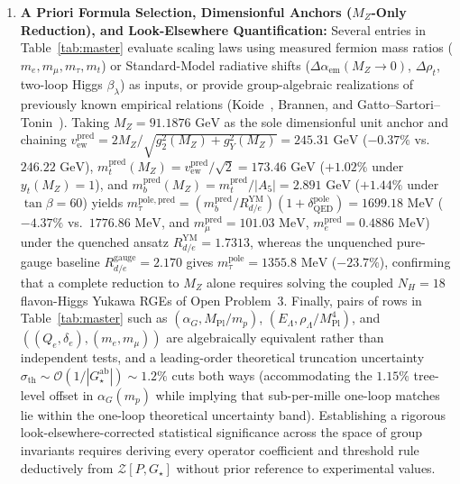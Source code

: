 \documentclass[11pt,a4paper]{article}
\theoremstyle{definition}
\theoremstyle{remark}
\newcommand{\Gstar}{G_\star}
\begin{document}
\begin{enumerate}
    \item \textbf{A Priori Formula Selection, Dimensionful Anchors ($M_Z$-Only Reduction), and Look-Elsewhere Quantification:}
    Several entries in Table~\ref{tab:master} evaluate scaling laws using measured fermion mass ratios ($m_e, m_\mu, m_\tau, m_t$) or Standard-Model radiative shifts ($\Delta\alpha_{\mathrm{em}}(M_Z \to 0)$, $\Delta\rho_t$, two-loop Higgs $\beta_\lambda$) as inputs, or provide group-algebraic realizations of previously known empirical relations (Koide~\cite{Koide1983}, Brannen, and Gatto--Sartori--Tonin~\cite{GattoSartoriTonin1968}). Taking $M_Z = 91.1876\text{ GeV}$ as the sole dimensionful unit anchor and chaining $v_{\mathrm{ew}}^{\mathrm{pred}} = 2M_Z/\sqrt{g_2^2(M_Z) + g_Y^2(M_Z)} = 245.31\text{ GeV}$ ($-0.37\%$ vs.\ $246.22\text{ GeV}$), $m_t^{\mathrm{pred}}(M_Z) = v_{\mathrm{ew}}^{\mathrm{pred}}/\sqrt{2} = 173.46\text{ GeV}$ ($+1.02\%$ under $y_t(M_Z) = 1$), and $m_b^{\mathrm{pred}}(M_Z) = m_t^{\mathrm{pred}}/|A_5| = 2.891\text{ GeV}$ ($+1.44\%$ under $\tan\beta = 60$) yields $m_\tau^{\mathrm{pole,pred}} = (m_b^{\mathrm{pred}}/R_{d/e}^{\mathrm{YM}})(1 + \delta_{\mathrm{QED}}^{\mathrm{pole}}) = 1699.18\text{ MeV}$ ($-4.37\%$ vs.\ $1776.86\text{ MeV}$, and $m_\mu^{\mathrm{pred}} = 101.03\text{ MeV}$, $m_e^{\mathrm{pred}} = 0.4886\text{ MeV}$) under the quenched ansatz $R_{d/e}^{\mathrm{YM}} = 1.7313$, whereas the unquenched pure-gauge baseline $R_{d/e}^{\mathrm{gauge}} = 2.170$ gives $m_\tau^{\mathrm{pole}} = 1355.8\text{ MeV}$ ($-23.7\%$), confirming that a complete reduction to $M_Z$ alone requires solving the coupled $N_H = 18$ flavon-Higgs Yukawa RGEs of Open Problem~3. Finally, pairs of rows in Table~\ref{tab:master} such as $(\alpha_G, M_{\mathrm{Pl}}/m_p)$, $(E_\Lambda, \rho_\Lambda/M_{\mathrm{Pl}}^4)$, and $((Q_e,\delta_e), (m_e,m_\mu))$ are algebraically equivalent rather than independent tests, and a leading-order theoretical truncation uncertainty $\sigma_{\mathrm{th}} \sim \mathcal{O}(1/|\Gstar^{\mathrm{ab}}|) \sim 1.2\%$ cuts both ways (accommodating the $1.15\%$ tree-level offset in $\alpha_G(m_p)$ while implying that sub-per-mille one-loop matches lie within the one-loop theoretical uncertainty band). Establishing a rigorous look-elsewhere-corrected statistical significance across the space of group invariants requires deriving every operator coefficient and threshold rule deductively from $\mathcal{Z}[P, \Gstar]$ without prior reference to experimental values.
\end{enumerate}
\end{document}
